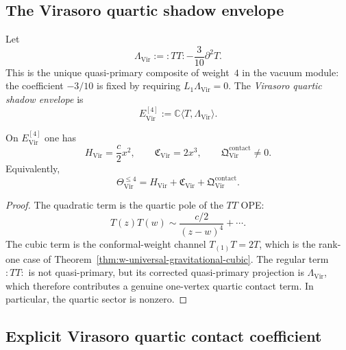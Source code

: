 \subsection{The Virasoro quartic shadow envelope}
\label{subsec:w-virasoro-shadow}

\begin{definition}
\label{def:w-virasoro-quartic-envelope}
Let
\[
\Lambda_{\mathrm{Vir}}:={:}TT{:}-\frac{3}{10}\partial^2T.
\]
This is the unique quasi-primary composite of weight~$4$ in the vacuum
module: the coefficient $-3/10$ is fixed by requiring
$L_1\Lambda_{\mathrm{Vir}}=0$.  The \emph{Virasoro quartic shadow
envelope} is
\[
E^{[4]}_{\mathrm{Vir}}:=\mathbb C\langle T,\Lambda_{\mathrm{Vir}}\rangle.
\]
\end{definition}

\begin{theorem}
\label{thm:w-virasoro-mixed-shadow}
On $E^{[4]}_{\mathrm{Vir}}$ one has
\[
H_{\mathrm{Vir}}=\frac{c}{2}x^2,
\qquad
\mathfrak C_{\mathrm{Vir}}=2x^3,
\qquad
\mathfrak Q^{\mathrm{contact}}_{\mathrm{Vir}}\neq 0.
\]
Equivalently,
\begin{equation}
\label{eq:w-virasoro-mixed-shadow}
\Theta_{\mathrm{Vir}}^{\le 4}
=H_{\mathrm{Vir}}+\mathfrak C_{\mathrm{Vir}}
+\mathfrak Q^{\mathrm{contact}}_{\mathrm{Vir}}.
\end{equation}
\end{theorem}

\begin{proof}
The quadratic term is the quartic pole of the $TT$ OPE:
\[
T(z)T(w)\sim \frac{c/2}{(z-w)^4}+\cdots.
\]
The cubic term is the conformal-weight channel $T_{(1)}T=2T$, which is
the rank-one case of
Theorem~\ref{thm:w-universal-gravitational-cubic}.  The regular term
${:}TT{:}$ is not quasi-primary, but its corrected quasi-primary
projection is $\Lambda_{\mathrm{Vir}}$, which therefore contributes a
genuine one-vertex quartic contact term.  In particular, the quartic
sector is nonzero.\qedhere
\end{proof}

\subsection{Explicit Virasoro quartic contact coefficient}
\label{subsec:w-virasoro-quartic-explicit}

